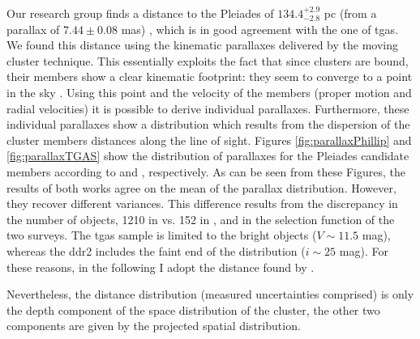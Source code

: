 Our research group finds a distance to the Pleiades of $134.4^{+2.9}_{-2.8} $ pc (from a parallax of $7.44\pm0.08$ mas) \citep{Galli2017}, which is in good agreement with the one of \gls{tgas}. We found this distance using the kinematic parallaxes delivered by the moving cluster technique. This essentially exploits the fact that since clusters are bound, their members show a clear kinematic footprint: they seem to converge to a point in the sky \citep{1964IAUS...20...50B}. Using this point and the velocity of the members (proper motion and radial velocities) it is possible to derive individual parallaxes. Furthermore, these individual parallaxes show a distribution which results from the dispersion of the cluster members distances along the line of sight. Figures \ref{fig:parallaxPhillip} and \ref{fig:parallaxTGAS} show the distribution of parallaxes for the Pleiades candidate members according to \citet{Galli2017} and \citet{2017A&A...601A..19G}, respectively. As can be seen from these Figures, the results of both works agree on the mean of the parallax distribution. However, they recover different variances. This difference results from the discrepancy in the number of objects, 1210 in \citet{Galli2017} vs. 152 in \citet{2017A&A...601A..19G}, and in the selection function of the two surveys. The \gls{tgas} sample is limited to the bright objects ($V \sim 11.5$ mag), whereas the \gls{ddr2} includes the faint end of the distribution ($i\sim25$ mag). For these reasons, in the following I adopt the distance found by \citet{Galli2017}.

Nevertheless, the distance distribution {(measured uncertainties comprised)} is only the depth component of the space distribution of the cluster, the other two components are given by the projected spatial distribution. 

